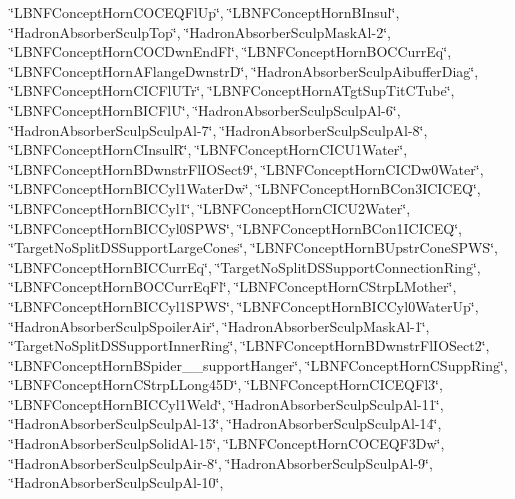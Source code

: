 \begin{DoxyCompactItemize}
\char`\"{}L\-B\-N\-F\-Concept\-Horn\-C\-O\-C\-E\-Q\-Fl\-Up\char`\"{}, \char`\"{}L\-B\-N\-F\-Concept\-Horn\-B\-Insul\char`\"{}, \char`\"{}Hadron\-Absorber\-Sculp\-Top\char`\"{}, \char`\"{}Hadron\-Absorber\-Sculp\-Mask\-Al-\/2\char`\"{}, \char`\"{}L\-B\-N\-F\-Concept\-Horn\-C\-O\-C\-Dwn\-End\-Fl\char`\"{}, \char`\"{}L\-B\-N\-F\-Concept\-Horn\-B\-O\-C\-Curr\-Eq\char`\"{}, \char`\"{}L\-B\-N\-F\-Concept\-Horn\-A\-Flange\-Dwnstr\-D\char`\"{}, \char`\"{}Hadron\-Absorber\-Sculp\-Aibuffer\-Diag\char`\"{}, \char`\"{}L\-B\-N\-F\-Concept\-Horn\-C\-I\-C\-Fl\-U\-Tr\char`\"{}, \char`\"{}L\-B\-N\-F\-Concept\-Horn\-A\-Tgt\-Sup\-Tit\-C\-Tube\char`\"{}, \char`\"{}L\-B\-N\-F\-Concept\-Horn\-B\-I\-C\-Fl\-U\char`\"{}, \char`\"{}Hadron\-Absorber\-Sculp\-Sculp\-Al-\/6\char`\"{}, \char`\"{}Hadron\-Absorber\-Sculp\-Sculp\-Al-\/7\char`\"{}, \char`\"{}Hadron\-Absorber\-Sculp\-Sculp\-Al-\/8\char`\"{}, \char`\"{}L\-B\-N\-F\-Concept\-Horn\-C\-Insul\-R\char`\"{}, \char`\"{}L\-B\-N\-F\-Concept\-Horn\-C\-I\-C\-U1\-Water\char`\"{}, \char`\"{}L\-B\-N\-F\-Concept\-Horn\-B\-Dwnstr\-Fl\-I\-O\-Sect9\char`\"{}, \char`\"{}L\-B\-N\-F\-Concept\-Horn\-C\-I\-C\-Dw0\-Water\char`\"{}, \char`\"{}L\-B\-N\-F\-Concept\-Horn\-B\-I\-C\-Cyl1\-Water\-Dw\char`\"{}, \char`\"{}L\-B\-N\-F\-Concept\-Horn\-B\-Con3\-I\-C\-I\-C\-E\-Q\char`\"{}, \char`\"{}L\-B\-N\-F\-Concept\-Horn\-B\-I\-C\-Cyl1\char`\"{}, \char`\"{}L\-B\-N\-F\-Concept\-Horn\-C\-I\-C\-U2\-Water\char`\"{}, \char`\"{}L\-B\-N\-F\-Concept\-Horn\-B\-I\-C\-Cyl0\-S\-P\-W\-S\char`\"{}, \char`\"{}L\-B\-N\-F\-Concept\-Horn\-B\-Con1\-I\-C\-I\-C\-E\-Q\char`\"{}, \char`\"{}Target\-No\-Split\-D\-S\-Support\-Large\-Cones\char`\"{}, \char`\"{}L\-B\-N\-F\-Concept\-Horn\-B\-Upstr\-Cone\-S\-P\-W\-S\char`\"{}, \char`\"{}L\-B\-N\-F\-Concept\-Horn\-B\-I\-C\-Curr\-Eq\char`\"{}, \char`\"{}Target\-No\-Split\-D\-S\-Support\-Connection\-Ring\char`\"{}, \char`\"{}L\-B\-N\-F\-Concept\-Horn\-B\-O\-C\-Curr\-Eq\-Fl\char`\"{}, \char`\"{}L\-B\-N\-F\-Concept\-Horn\-C\-Strp\-L\-Mother\char`\"{}, \char`\"{}L\-B\-N\-F\-Concept\-Horn\-B\-I\-C\-Cyl1\-S\-P\-W\-S\char`\"{}, \char`\"{}L\-B\-N\-F\-Concept\-Horn\-B\-I\-C\-Cyl0\-Water\-Up\char`\"{}, \char`\"{}Hadron\-Absorber\-Sculp\-Spoiler\-Air\char`\"{}, \char`\"{}Hadron\-Absorber\-Sculp\-Mask\-Al-\/1\char`\"{}, \char`\"{}Target\-No\-Split\-D\-S\-Support\-Inner\-Ring\char`\"{}, \char`\"{}L\-B\-N\-F\-Concept\-Horn\-B\-Dwnstr\-Fl\-I\-O\-Sect2\char`\"{}, \char`\"{}L\-B\-N\-F\-Concept\-Horn\-B\-Spider\-\_\-\_\-support\-Hanger\char`\"{}, \char`\"{}L\-B\-N\-F\-Concept\-Horn\-C\-Supp\-Ring\char`\"{}, \char`\"{}L\-B\-N\-F\-Concept\-Horn\-C\-Strp\-L\-Long45\-D\char`\"{}, \char`\"{}L\-B\-N\-F\-Concept\-Horn\-C\-I\-C\-E\-Q\-Fl3\char`\"{}, \char`\"{}L\-B\-N\-F\-Concept\-Horn\-B\-I\-C\-Cyl1\-Weld\char`\"{}, \char`\"{}Hadron\-Absorber\-Sculp\-Sculp\-Al-\/11\char`\"{}, \char`\"{}Hadron\-Absorber\-Sculp\-Sculp\-Al-\/13\char`\"{}, \char`\"{}Hadron\-Absorber\-Sculp\-Sculp\-Al-\/14\char`\"{}, \char`\"{}Hadron\-Absorber\-Sculp\-Solid\-Al-\/15\char`\"{}, \char`\"{}L\-B\-N\-F\-Concept\-Horn\-C\-O\-C\-E\-Q\-F3\-Dw\char`\"{}, \char`\"{}Hadron\-Absorber\-Sculp\-Sculp\-Air-\/8\char`\"{}, \char`\"{}Hadron\-Absorber\-Sculp\-Sculp\-Al-\/9\char`\"{}, \char`\"{}Hadron\-Absorber\-Sculp\-Sculp\-Al-\/10\char`\"{}, 
\end{DoxyCompactItemize}
